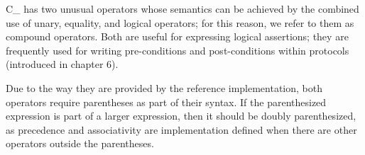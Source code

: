 C\_ has two unusual operators whose semantics can be achieved
by the combined use of unary, equality, and logical operators;
for this reason, we refer to them as compound operators.
Both are useful for expressing logical assertions;
they are frequently used for writing pre-conditions and
post-conditions within protocols (introduced in chapter 6).

Due to the way they are provided by the reference implementation,
both operators require parentheses as part of their syntax.
If the parenthesized expression is part of a larger expression,
then it should be doubly parenthesized, as precedence and associativity are
implementation defined when there are other operators outside the parentheses.

\subsection{}


\subsection{}

